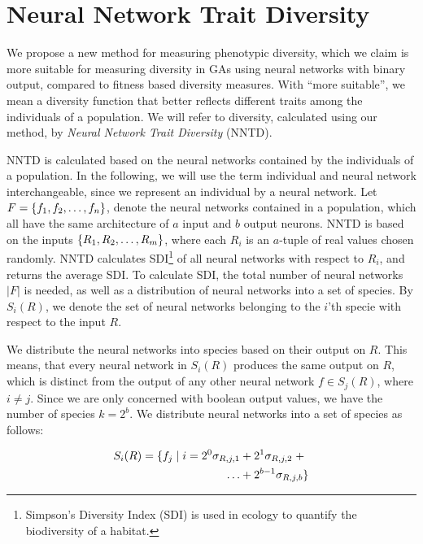 \section{Neural Network Trait Diversity}
We propose a new method for measuring phenotypic diversity, which we claim is more suitable for measuring diversity in GAs using neural networks with binary output, compared to fitness based diversity measures. With ``more suitable'', we mean a diversity function that better reflects different traits among the individuals of a population. We will refer to diversity, calculated using our method, by \emph{Neural Network Trait Diversity} (NNTD).

NNTD is calculated based on the neural networks contained by the individuals of a population. In the following, we will use the term individual and neural network interchangeable, since we represent an individual by a neural network.  Let $F = \{ f_1, f_2, \dots, f_n \}$, denote the neural networks contained in a population, which all have the same architecture of $a$ input and $b$ output neurons.  NNTD is based on the inputs $\{ R_1, R_2, \dots, R_m \}$, where each $R_i$ is an $a$-tuple of real values chosen randomly. NNTD calculates SDI\footnote{Simpson's Diversity Index (SDI) is used in ecology to quantify the biodiversity of a habitat.} of all neural networks with respect to $R_i$, and returns the average SDI. To calculate SDI, the total number of neural networks $\lvert F \lvert$ is needed, as well as a distribution of neural networks into a set of species. By $S_i(R)$, we denote the set of neural networks belonging to the $i$'th specie with respect to the input $R$.

We distribute the neural networks into species based on their output on $R$. This means, that every neural network in $S_i(R)$ produces the same output on $R$, which is distinct from the output of any other neural network $f \in S_j(R)$, where $i \neq j$.
Since we are only concerned with boolean output values, we have the number of species $k = 2^b$. 
We distribute neural networks into a set of species as follows:

\begin{equation*}\label{eq:species}
  \begin{split}
    S_i(R) = \{ f_j \mid i = 2^0\sigma_{R,j,1} & + 2^1\sigma_{R,j,2}\; + \\
  \dots & + 2^{b-1}\sigma_{R,j,b} \}
  \end{split}
\end{equation*}

